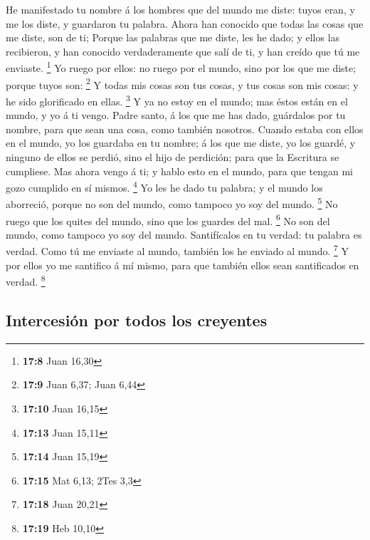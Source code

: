  He manifestado tu nombre á los hombres que del mundo me
diste: tuyos eran, y me los diste, y guardaron tu palabra.
 Ahora han conocido que todas las cosas que me diste, son
de ti;  Porque las palabras que me diste, les he dado; y
ellos las recibieron, y han conocido verdaderamente que salí de ti, y
han creído que tú me enviaste. \footnote{\textbf{17:8} Juan 16,30}
 Yo ruego por ellos: no ruego por el mundo, sino por los
que me diste; porque tuyos son: \footnote{\textbf{17:9} Juan 6,37; Juan
  6,44}  Y todas mis cosas son tus cosas, y tus cosas son
mis cosas: y he sido glorificado en ellas. \footnote{\textbf{17:10} Juan
  16,15}  Y ya no estoy en el mundo; mas éstos están en
el mundo, y yo á ti vengo. Padre santo, á los que me has dado, guárdalos
por tu nombre, para que sean una cosa, como también nosotros.
 Cuando estaba con ellos en el mundo, yo los guardaba en
tu nombre; á los que me diste, yo los guardé, y ninguno de ellos se
perdió, sino el hijo de perdición; para que la Escritura se cumpliese.
 Mas ahora vengo á ti; y hablo esto en el mundo, para que
tengan mi gozo cumplido en sí mismos. \footnote{\textbf{17:13} Juan
  15,11}  Yo les he dado tu palabra; y el mundo los
aborreció, porque no son del mundo, como tampoco yo soy del mundo.
\footnote{\textbf{17:14} Juan 15,19}  No ruego que los
quites del mundo, sino que los guardes del mal. \footnote{\textbf{17:15}
  Mat 6,13; 2Tes 3,3}  No son del mundo, como tampoco yo
soy del mundo.  Santifícalos en tu verdad: tu palabra es
verdad.  Como tú me enviaste al mundo, también los he
enviado al mundo. \footnote{\textbf{17:18} Juan 20,21}  Y
por ellos yo me santifico á mí mismo, para que también ellos sean
santificados en verdad. \footnote{\textbf{17:19} Heb 10,10}

\hypertarget{intercesiuxf3n-por-todos-los-creyentes}{%
\subsection{Intercesión por todos los
creyentes}\label{intercesiuxf3n-por-todos-los-creyentes}}

